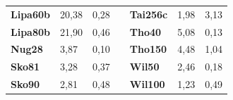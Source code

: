 \documentclass[a4paper, 12pt]{article}
\begin{document}
\begin{table}[H]
\begin{tabular}{|l|l|l|l|l|l|l|}
\textbf{Lipa60b}                    & 20,38                              & 0,28                                 &                                & \textbf{Tai256c}                   & 1,98                               & 3,13                                 \\ \cline{1-3} \cline{5-7} 
\textbf{Lipa80b}                    & 21,90                              & 0,46                                 &                                & \textbf{Tho40}                     & 5,08                               & 0,13                                 \\ \cline{1-3} \cline{5-7} 
\textbf{Nug28}                      & 3,87                               & 0,10                                 &                                & \textbf{Tho150}                    & 4,48                               & 1,04                                 \\ \cline{1-3} \cline{5-7} 
\textbf{Sko81}                      & 3,28                               & 0,37                                 &                                & \textbf{Wil50}                     & 2,46                               & 0,18                                 \\ \cline{1-3} \cline{5-7} 
\textbf{Sko90}                      & 2,81                               & 0,48                                 &                                & \textbf{Wil100}                    & 1,23                               & 0,49                                 \\ \cline{1-3} \cline{5-7} 
\end{tabular}
\end{table}
      
      
      \newpage
\end{document}
